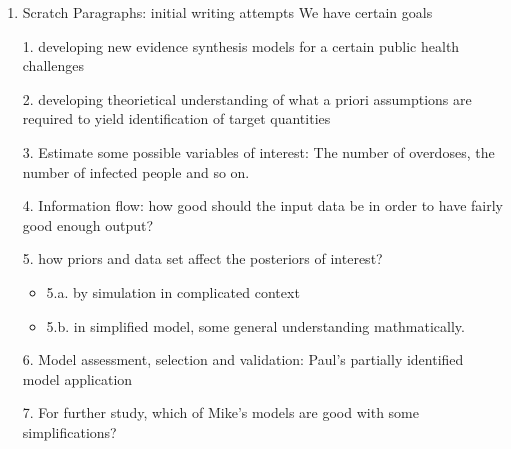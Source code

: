 \documentclass[]{article}
\begin{document}
\begin{enumerate}
	\item{Scratch Paragraphs: initial writing attempts}
	We have certain goals 
	
	1. developing new evidence synthesis models for a certain public health challenges
	
	2. developing theorietical understanding of what a priori assumptions are required to yield identification of target quantities 
	
	3. Estimate some possible variables of interest:
	The number of overdoses, the number of infected people and so on.
	
	4. Information flow: how good should the input data be in order to have fairly good enough output?
	
	5. how priors and data set affect the posteriors of interest?
	
	\begin{itemize}
		\item 5.a. by simulation in complicated context
		\item  5.b. in simplified model, some general understanding mathmatically.
	\end{itemize}
	
	6. Model assessment, selection and validation:
	Paul's partially identified model application
	
	7. For further study, which of Mike's models are good with some simplifications? 
	
	
\end{enumerate}
\end{document}
